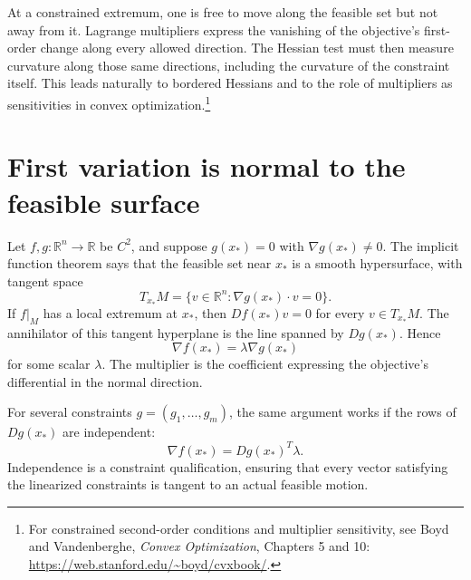 
At a constrained extremum, one is free to move along the feasible set but not away from it. Lagrange multipliers express the vanishing of the objective's first-order change along every allowed direction. The Hessian test must then measure curvature along those same directions, including the curvature of the constraint itself. This leads naturally to bordered Hessians and to the role of multipliers as sensitivities in convex optimization.\footnote{For constrained second-order conditions and multiplier sensitivity, see Boyd and Vandenberghe, \emph{Convex Optimization}, Chapters 5 and 10: \url{https://web.stanford.edu/~boyd/cvxbook/}.}

\section{First variation is normal to the feasible surface}

Let \(f,g:\mathbb R^n\to\mathbb R\) be \(C^2\), and suppose \(g(x_*)=0\) with \(\nabla g(x_*)\ne0\). The implicit function theorem says that the feasible set near \(x_*\) is a smooth hypersurface, with tangent space
\[
 T_{x_*}M=\{v\in\mathbb R^n:\nabla g(x_*)\cdot v=0\}.
\]
If \(f|_M\) has a local extremum at \(x_*\), then \(Df(x_*)v=0\) for every \(v\in T_{x_*}M\). The annihilator of this tangent hyperplane is the line spanned by \(Dg(x_*)\). Hence
\[
 \boxed{\nabla f(x_*)=\lambda\nabla g(x_*)}
\]
for some scalar \(\lambda\). The multiplier is the coefficient expressing the objective's differential in the normal direction.

For several constraints \(g=(g_1,\ldots,g_m)\), the same argument works if the rows of \(Dg(x_*)\) are independent:
\[
 \nabla f(x_*)=Dg(x_*)^T\lambda.
\]
Independence is a constraint qualification, ensuring that every vector satisfying the linearized constraints is tangent to an actual feasible motion.

